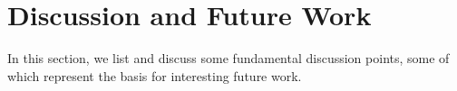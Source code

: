 {%




\section{Discussion and Future Work}
\label{sec:Discussion}
In this section, we list and discuss some fundamental discussion points, some of which represent the basis for interesting future work. 
}
